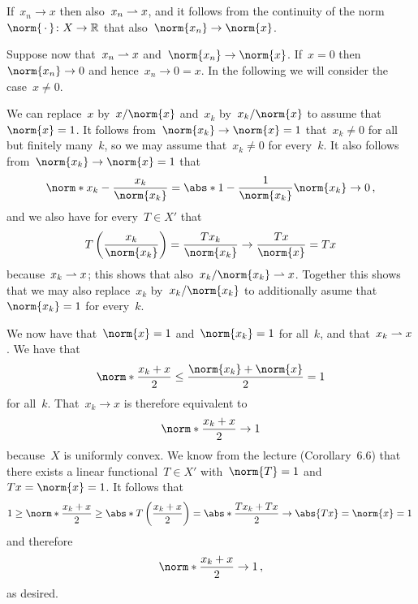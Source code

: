 \section{}

If~$x_n \to x$ then also~$x_n \rightharpoonup x$, and it follows from the continuity of the norm~$\norm{\,\cdot\,} \colon X \to \Real$ that also~$\norm{x_n} \to \norm{x}$.

Suppose now that~$x_n \rightharpoonup x$ and~$\norm{x_n} \to \norm{x}$.
If~$x = 0$ then~$\norm{x_n} \to 0$ and hence~$x_n \to 0 = x$.
In the following we will consider the case~$x \neq 0$.

We can replace~$x$ by~$x/\norm{x}$ and~$x_k$ by~$x_k/\norm{x}$ to assume that~$\norm{x} = 1$.
It follows from~$\norm{x_k} \to \norm{x} = 1$ that~$x_k \neq 0$ for all but finitely many~$k$, so we may assume that~$x_k \neq 0$ for every~$k$.
It also follows from~$\norm{x_k} \to \norm{x} = 1$ that
\[
  \norm*{ x_k - \frac{x_k}{\norm{x_k}} }
  =
  \abs*{ 1 - \frac{1}{\norm{x_k}} }
  \norm{ x_k }
  \to
  0 \,,
\]
and we also have for every~$T \in X'$ that
\[
  T\left( \frac{x_k}{\norm{x_k}} \right)
  =
  \frac{T x_k}{\norm{x_k}}
  \to
  \frac{T x}{\norm{x}}
  =
  T x
\]
because~$x_k \rightharpoonup x$;
this shows that also~$x_k/\norm{x_k} \wto x$.
Together this shows that we may also replace~$x_k$ by~$x_k/\norm{x_k}$ to additionally asume that~$\norm{x_k} = 1$ for every~$k$.

We now have that~$\norm{x} = 1$ and~$\norm{x_k} = 1$ for all~$k$, and that~$x_k \rightharpoonup x$.
We have that
\[
  \norm*{ \frac{x_k + x}{2} }
  \leq
  \frac{ \norm{x_k} + \norm{x} }{2}
  =
  1
\]
for all~$k$.
That~$x_k \to x$ is therefore equivalent to
\[
  \norm*{ \frac{x_k + x}{2} }
  \to
  1
\]
because~$X$ is uniformly convex.
We know from the lecture (Corollary~6.6) that there exists a linear functional~$T \in X'$ with~$\norm{T} = 1$ and~$Tx = \norm{x} = 1$.
It follows that
\[
  1
  \geq
  \norm*{ \frac{x_k + x}{2} }
  \geq
  \abs*{ T\left( \frac{x_k + x}{2} \right) }
  =
  \abs*{ \frac{T x_k + T x}{2} }
  \to
  \abs{ Tx }
  =
  \norm{x}
  =
  1 \,
\]
and therefore
\[
  \norm*{ \frac{x_k + x}{2} }
  \to
  1 \,,
\]
as desired.




